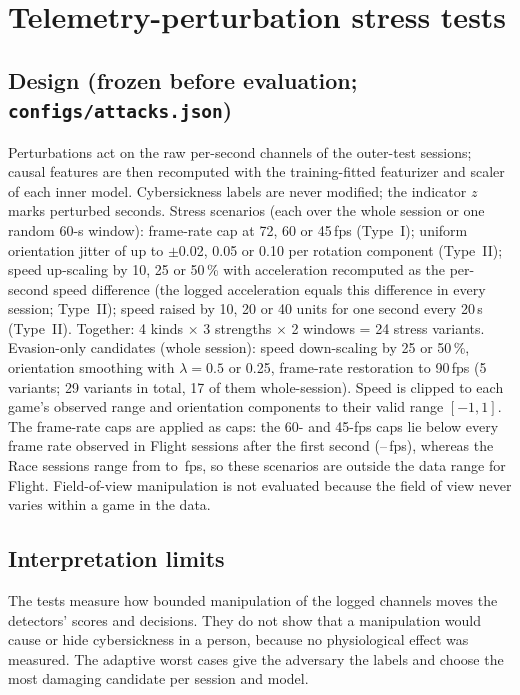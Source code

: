 \section{Telemetry-perturbation stress tests}
\label{sec:s-attacks}

\subsection{Design (frozen before evaluation; \texttt{configs/\allowbreak attacks.json})}
Perturbations act on the raw per-second channels of the outer-test sessions; causal features are then recomputed with the training-fitted featurizer and scaler of each inner model. Cybersickness labels are never modified; the indicator $z$ marks perturbed seconds. Stress scenarios (each over the whole session or one random 60-s window): frame-rate cap at 72, 60 or 45\,fps (Type~I); uniform orientation jitter of up to $\pm$0.02, 0.05 or 0.10 per rotation component (Type~II); speed up-scaling by 10, 25 or 50\,\% with acceleration recomputed as the per-second speed difference (the logged acceleration equals this difference in every session; Type~II); speed raised by 10, 20 or 40 units for one second every 20\,s (Type~II). Together: 4 kinds $\times$ 3 strengths $\times$ 2 windows = 24 stress variants. Evasion-only candidates (whole session): speed down-scaling by 25 or 50\,\%, orientation smoothing with $\lambda=0.5$ or 0.25, frame-rate restoration to 90\,fps (5 variants; 29 variants in total, 17 of them whole-session). Speed is clipped to each game's observed range and orientation components to their valid range $[-1,1]$. The frame-rate caps are applied as caps: the 60- and 45-fps caps lie below every frame rate observed in Flight sessions after the first second (\SSFpsFlightMin--\SSFpsFlightMax\,fps), whereas the Race sessions range from \SSFpsRaceMin{} to \SSFpsRaceMax\,fps, so these scenarios are outside the data range for Flight. Field-of-view manipulation is not evaluated because the field of view never varies within a game in the data.

\subsection{Interpretation limits}
The tests measure how bounded manipulation of the logged channels moves the detectors' scores and decisions. They do not show that a manipulation would cause or hide cybersickness in a person, because no physiological effect was measured. The adaptive worst cases give the adversary the labels and choose the most damaging candidate per session and model.

